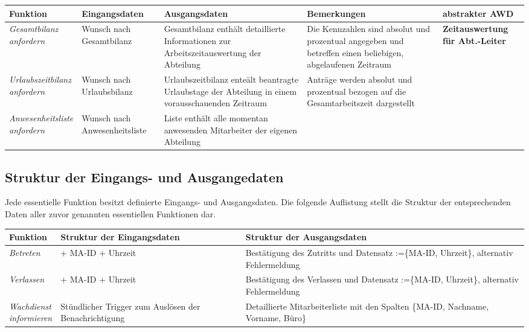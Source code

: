 {
\hspace{-3,5cm}
\footnotesize
\begin{tabular}{|p{3cm}|p{4cm}|p{4cm}|p{4cm}|p{2cm}|}
	\hline
		\textbf{Funktion	} &	
		\textbf{Eingangsdaten} &
		\textbf{Ausgangsdaten}& 
		\textbf{Bemerkungen}	&
		\textbf{abstrakter AWD} \\
	\hline \hline 
		\textit{Gesamtbilanz \newline anfordern} &
		Wunsch nach Gesamtbilanz &
		Gesamtbilanz enth\"alt detaillierte Informationen zur Arbeits\-zeit\-auswertung der Abteilung &
		Die Kennzahlen sind absolut und prozentual angegeben und betreffen einen beliebigen, abgelaufenen Zeitraum &
		\textbf{Zeitaus\-wertung f\"ur Abt.-Leiter}\\
	\cline{1-4}
		\textit{Urlaubszeitbilanz \newline anfordern} &
		Wunsch nach Urlaubsbilanz &
		Urlaubszeitbilanz ente\"alt beantragte Urlaubstage der Abteilung in einem vorausschauenden Zeitraum &
		Antr\"age werden absolut und prozentual bezogen auf die Gesamtarbeitszeit dargestellt &
		\\ 
	\cline{1-4}
		\textit{Anwesenheitsliste \newline anfordern}&
		Wunsch nach Anwesenheitsliste &
		Liste enth\"alt alle momentan anwesenden Mitarbeiter der eigenen Abteilung &
		&
		\\
	\hline
\end{tabular}
}

\subsection{Struktur der Eingangs- und Ausgangedaten}
Jede essentielle Funktion besitzt definierte Eingangs- und Ausgangsdaten. Die folgende Auflistung stellt die Struktur der entsprechenden Daten aller zuvor genannten essentiellen Funktionen dar.

{
\vspace{0.7cm}
\hspace{-2cm}
\footnotesize
\begin{tabular}{|p{3cm}|p{6cm}|p{6cm}|}
	\hline
		\textbf{Funktion	} &	
		\textbf{Struktur der Eingangsdaten} &
		\textbf{Struktur der Ausgangsdaten} \\
	\hline \hline
		\textit{Betreten} &
		+ MA-ID \newline + Uhrzeit &
		Best\"atigung des Zutritts und \newline Datensatz :=\{MA-ID, Uhrzeit\}, \newline alternativ Fehlermeldung \\
	\hline
		\textit{Verlassen} &
		+ MA-ID \newline + Uhrzeit &
		Best\"atigung des Verlassen und \newline Datensatz :=\{MA-ID, Uhrzeit\}, \newline alternativ Fehlermeldung \\
	\hline
		\textit{Wachdienst \newline informieren} &
		St\"undlicher Trigger zum Ausl\"osen der Benachrichtigung&
		Detaillierte Mitarbeiterliste mit den Spalten \{MA-ID, Nachname, Vorname, B\"uro\} \\
	\hline 
\end{tabular}
}

